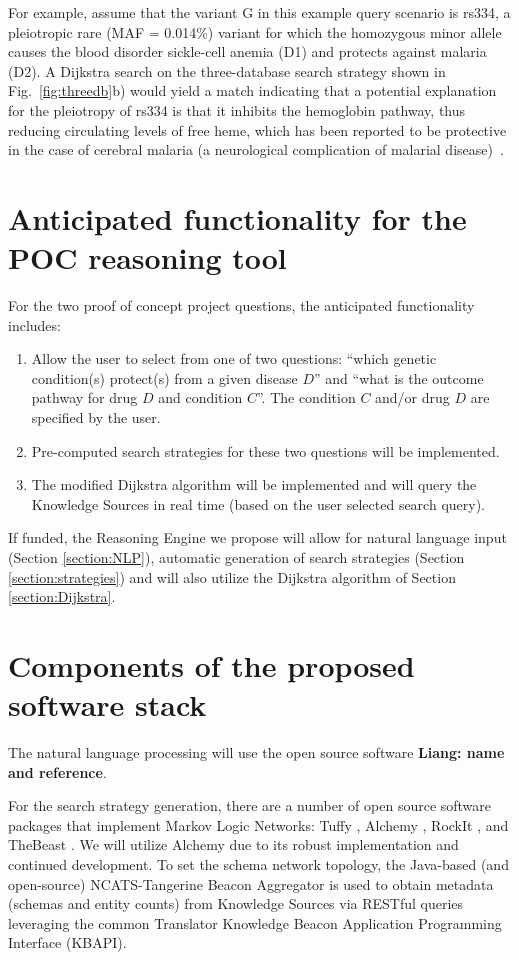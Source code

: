 \documentclass[11pt,notitlepage]{article}
\begin{document}
For example, assume that the variant G in this example query scenario is rs334, a pleiotropic rare (MAF = 0.014\%) variant for which the homozygous minor allele causes the blood disorder sickle-cell anemia (D1) and protects against malaria (D2). A Dijkstra search on the three-database search strategy shown in Fig.~\ref{fig:threedb}b) would yield a match indicating that a potential explanation for the pleiotropy of rs334 is that it inhibits the hemoglobin pathway, thus reducing circulating levels of free heme, which has been reported to be protective in the case of cerebral malaria (a neurological complication of malarial disease)~\cite{Ferreira:2011ff}.


\section{Anticipated functionality for the POC reasoning tool}
For the two proof of concept project questions, the anticipated functionality includes:
\begin{enumerate}
\item Allow the user to select from one of two questions: ``which genetic condition(s) protect(s) from a given disease $D$'' and ``what is the outcome pathway for drug $D$ and condition $C$''. The condition $C$ and/or drug $D$ are specified by the user.
\item Pre-computed search strategies for these two questions will be implemented.
\item The modified Dijkstra algorithm will be implemented and will query the Knowledge Sources in real time (based on the user selected search query).
\end{enumerate}
If funded, the Reasoning Engine we propose will allow for natural language input (Section \ref{section:NLP}), automatic generation of search strategies (Section \ref{section:strategies}) and will also utilize the Dijkstra algorithm of Section \ref{section:Dijkstra}.

\section{Components of the proposed software stack}
The natural language processing will use the open source software \textbf{Liang: name and reference}.

For the search strategy generation, there are a number of open source software packages that implement Markov Logic Networks: Tuffy \cite{DBLP:journals/pvldb/NiuRDS11}, Alchemy \cite{kok2006alchemy}, RockIt \cite{noessner2013rockit}, and TheBeast \cite{riedel08improving}. We will utilize Alchemy due to its robust implementation and continued development. To set the schema network topology, the Java-based (and open-source) NCATS-Tangerine Beacon Aggregator is used to obtain metadata (schemas and entity counts) from Knowledge Sources via RESTful queries leveraging the common Translator Knowledge Beacon Application Programming Interface (KBAPI).
 
\end{document}
